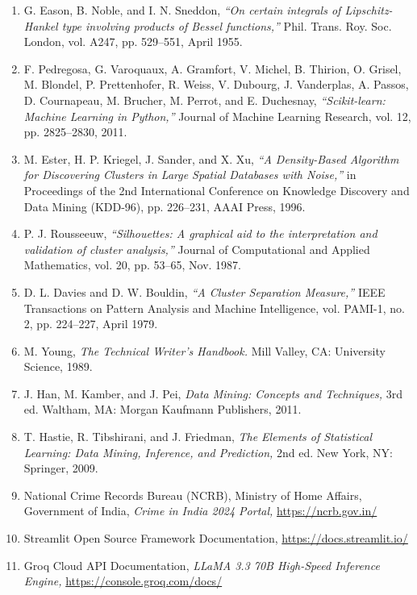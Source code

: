 \documentclass[12pt,a4paper]{report}
\begin{document}
\begin{enumerate}[leftmargin=*]
    \item G. Eason, B. Noble, and I. N. Sneddon, \textit{“On certain integrals of Lipschitz-Hankel type involving products of Bessel functions,”} Phil. Trans. Roy. Soc. London, vol. A247, pp. 529--551, April 1955.
    \item F. Pedregosa, G. Varoquaux, A. Gramfort, V. Michel, B. Thirion, O. Grisel, M. Blondel, P. Prettenhofer, R. Weiss, V. Dubourg, J. Vanderplas, A. Passos, D. Cournapeau, M. Brucher, M. Perrot, and E. Duchesnay, \textit{“Scikit-learn: Machine Learning in Python,”} Journal of Machine Learning Research, vol. 12, pp. 2825--2830, 2011.
    \item M. Ester, H. P. Kriegel, J. Sander, and X. Xu, \textit{“A Density-Based Algorithm for Discovering Clusters in Large Spatial Databases with Noise,”} in Proceedings of the 2nd International Conference on Knowledge Discovery and Data Mining (KDD-96), pp. 226--231, AAAI Press, 1996.
    \item P. J. Rousseeuw, \textit{“Silhouettes: A graphical aid to the interpretation and validation of cluster analysis,”} Journal of Computational and Applied Mathematics, vol. 20, pp. 53--65, Nov. 1987.
    \item D. L. Davies and D. W. Bouldin, \textit{“A Cluster Separation Measure,”} IEEE Transactions on Pattern Analysis and Machine Intelligence, vol. PAMI-1, no. 2, pp. 224--227, April 1979.

    \item M. Young, \textit{The Technical Writer’s Handbook.} Mill Valley, CA: University Science, 1989.
    \item J. Han, M. Kamber, and J. Pei, \textit{Data Mining: Concepts and Techniques,} 3rd ed. Waltham, MA: Morgan Kaufmann Publishers, 2011.
    \item T. Hastie, R. Tibshirani, and J. Friedman, \textit{The Elements of Statistical Learning: Data Mining, Inference, and Prediction,} 2nd ed. New York, NY: Springer, 2009.

    \item National Crime Records Bureau (NCRB), Ministry of Home Affairs, Government of India, \textit{Crime in India 2024 Portal,} \url{https://ncrb.gov.in/}
    \item Streamlit Open Source Framework Documentation, \url{https://docs.streamlit.io/}
    \item Groq Cloud API Documentation, \textit{LLaMA 3.3 70B High-Speed Inference Engine,} \url{https://console.groq.com/docs/}
\end{enumerate}
\end{document}
